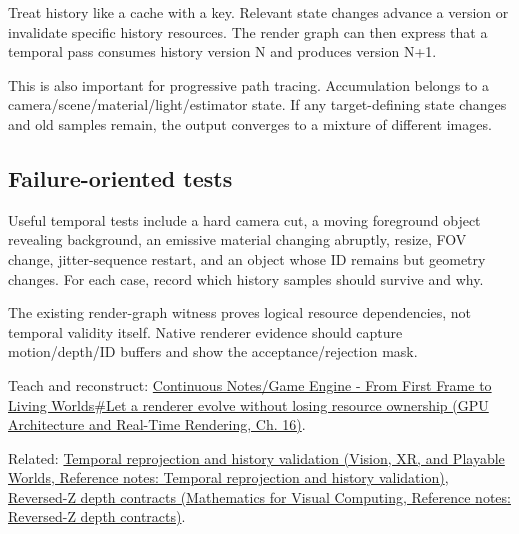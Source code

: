 \hypertarget{appendix-2e7e9fd28a2c-versioned-history}{}

Treat history like a cache with a key. Relevant state changes advance a version or invalidate specific history resources. The render graph can then express that a temporal pass consumes history version N and produces version N+1.

This is also important for progressive path tracing. Accumulation belongs to a camera/scene/material/light/estimator state. If any target-defining state changes and old samples remain, the output converges to a mixture of different images.

\subsection{Failure-oriented tests}\label{appendix-2e7e9fd28a2c-failure-oriented-tests}

\hypertarget{appendix-2e7e9fd28a2c-failure-oriented-tests}{}

Useful temporal tests include a hard camera cut, a moving foreground object revealing background, an emissive material changing abruptly, resize, FOV change, jitter-sequence restart, and an object whose ID remains but geometry changes. For each case, record which history samples should survive and why.

The existing render-graph witness proves logical resource dependencies, not temporal validity itself. Native renderer evidence should capture motion/depth/ID buffers and show the acceptance/rejection mask.

Teach and reconstruct: \href{../06-GPU-Architecture-and-Real-Time-Rendering/main.pdf\#nameddest=06-engine-ii-ch025-let-a-renderer-evolve-without-losing-resource-ownership}{Continuous Notes/Game Engine - From First Frame to Living Worlds\#Let a renderer evolve without losing resource ownership (GPU Architecture and Real-Time Rendering, Ch. 16)}.

Related: \href{../07-Vision-XR-and-Playable-Worlds/main.pdf\#nameddest=appendix-0727340a4428}{Temporal reprojection and history validation (Vision, XR, and Playable Worlds, Reference notes: Temporal reprojection and history validation)}, \href{../02-Mathematics-for-Visual-Computing/main.pdf\#nameddest=appendix-275ec8847057}{Reversed-Z depth contracts (Mathematics for Visual Computing, Reference notes: Reversed-Z depth contracts)}.
